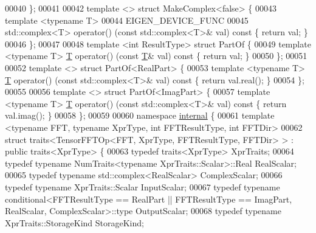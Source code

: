 \begin{DoxyCode}
00040 \};
00041 
00042 \textcolor{keyword}{template} <> \textcolor{keyword}{struct }MakeComplex<false> \{
00043   \textcolor{keyword}{template} <\textcolor{keyword}{typename} T>
00044   EIGEN\_DEVICE\_FUNC
00045   std::complex<T> operator() (\textcolor{keyword}{const} std::complex<T>& val)\textcolor{keyword}{ const }\{ \textcolor{keywordflow}{return} val; \}
00046 \};
00047 
00048 \textcolor{keyword}{template} <\textcolor{keywordtype}{int} ResultType> \textcolor{keyword}{struct }PartOf \{
00049   \textcolor{keyword}{template} <\textcolor{keyword}{typename} T> \hyperlink{group___sparse_core___module_class_eigen_1_1_triplet}{T} operator() (\textcolor{keyword}{const} \hyperlink{group___sparse_core___module_class_eigen_1_1_triplet}{T}& val)\textcolor{keyword}{ const }\{ \textcolor{keywordflow}{return} val; \}
00050 \};
00051 
00052 \textcolor{keyword}{template} <> \textcolor{keyword}{struct }PartOf<RealPart> \{
00053   \textcolor{keyword}{template} <\textcolor{keyword}{typename} T> \hyperlink{group___sparse_core___module_class_eigen_1_1_triplet}{T} operator() (\textcolor{keyword}{const} std::complex<T>& val)\textcolor{keyword}{ const }\{ \textcolor{keywordflow}{return} val.real(); \}
00054 \};
00055 
00056 \textcolor{keyword}{template} <> \textcolor{keyword}{struct }PartOf<ImagPart> \{
00057   \textcolor{keyword}{template} <\textcolor{keyword}{typename} T> \hyperlink{group___sparse_core___module_class_eigen_1_1_triplet}{T} operator() (\textcolor{keyword}{const} std::complex<T>& val)\textcolor{keyword}{ const }\{ \textcolor{keywordflow}{return} val.imag(); \}
00058 \};
00059 
00060 \textcolor{keyword}{namespace }\hyperlink{namespaceinternal}{internal} \{
00061 \textcolor{keyword}{template} <\textcolor{keyword}{typename} FFT, \textcolor{keyword}{typename} XprType, \textcolor{keywordtype}{int} FFTResultType, \textcolor{keywordtype}{int} FFTDir>
00062 \textcolor{keyword}{struct }traits<TensorFFTOp<FFT, XprType, FFTResultType, FFTDir> > : \textcolor{keyword}{public} traits<XprType> \{
00063   \textcolor{keyword}{typedef} traits<XprType> XprTraits;
00064   \textcolor{keyword}{typedef} \textcolor{keyword}{typename} NumTraits<typename XprTraits::Scalar>::Real RealScalar;
00065   \textcolor{keyword}{typedef} \textcolor{keyword}{typename} std::complex<RealScalar> ComplexScalar;
00066   \textcolor{keyword}{typedef} \textcolor{keyword}{typename} XprTraits::Scalar InputScalar;
00067   \textcolor{keyword}{typedef} \textcolor{keyword}{typename} conditional<FFTResultType == RealPart || FFTResultType == ImagPart, RealScalar,
       ComplexScalar>::type OutputScalar;
00068   \textcolor{keyword}{typedef} \textcolor{keyword}{typename} XprTraits::StorageKind StorageKind;

\end{DoxyCode}

